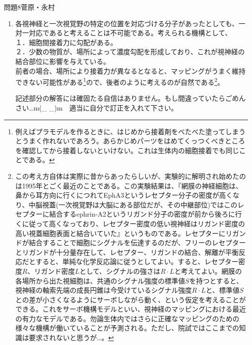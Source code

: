 \documentclass[fleqn]{jbook}
\begin{document}
\begin{answer}{問題8}{菅原・永村}
\begin{enumerate}
\item 各視神経と一次視覚野の特定の位置を対応づける分子があったとしても、一対一対応であると考えることは不可能である。考えられる機構として、\\
１．細胞間接着力に勾配がある。 \\
２．少数の物質が、場所によって濃度勾配を形成しており、これが視神経の結合部位に影響を与えている。 \\
前者の場合、場所により接着力が異なるとなると、マッピングがうまく維持できない可能性がある\footnote{例えばプラモデルを作るときに、はじめから接着剤をべたべた塗ってしまうとうまく作れないであろう。あらかじめパーツをはめてくっつくべきところを確認してから接着しないといけない。これは生体内の細胞接着でも同じことである。}ので、後者のように考えるのが自然である\footnote{この考え方自体は実際に昔からあったらしいが、実験的に解明され始めたのは1995年とごく最近のことである。この実験結果は、『網膜の神経細胞は、鼻から耳方向に行くにつれてEphA3というレセプター分子の密度が高くなり、中脳視蓋(一次視覚野は大脳にある部位だが、その中継部位)ではこのレセプターに結合するephrin-A2というリガンド分子の密度が前から後ろに行くに従って高くなっており、レセプター密度の低い視神経はリガンド密度の高い視蓋細胞表面と結合いていた』というものである。レセプターにリガンドが結合することで細胞にシグナルを伝達するのだが、フリーのレセプターとリガンドが十分量存在して、レセプター、リガンドの結合、解離が平衡反応だとすると、単純な化学反応論に従うとしてよい。すると、レセプター密度$R$、リガンド密度$L$として、シグナルの強さは$R \cdot L$と考えてよい。網膜の各場所から出た視細胞は、共通のシグナル強度の標準値$S$を持つとすると、視神経の軸索先端の成長円錐は今受けているシグナル強度$R \cdot L$と、標準値$S$との差が小さくなるようにサーボしながら動く、という仮定を考えることができる。これをサーボ機構モデルといい、視神経のマッピングにおける最近の有力なモデルである。勿論生体内ではさらに正確なマッピングのための様々な機構が働いていることが予測される。ただし、院試ではここまでの知識は要求されないと思うが…。}。

\bigskip

記述部分の解答には確固たる自信はありません。もし間違っていたらごめんさい…m(\_ \_)m　適当に自分で訂正を入れて下さい。

\end{enumerate}
\end{answer}
\end{document}
